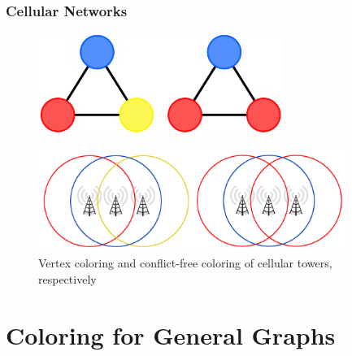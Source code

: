 \documentclass[xcolor=dvipsnames,aspectratio=1610]{beamer}
\begin{document}
  \begin{frame}
    \frametitle{Cellular Networks}

    \begin{figure}[h]
      \centering
      \includegraphics[width=8cm,trim=4 4 4 4,clip]{../figures/towers-graph.pdf}
    \end{figure}

    \begin{figure}[h]
      \centering
      \includegraphics[width=10cm,trim=4 4 4 4,clip]{../figures/towers.pdf}
      \caption*{Vertex coloring and conflict-free coloring of cellular towers, respectively}
    \end{figure}


  \end{frame}





  \section{Coloring for General Graphs}
\end{document}
